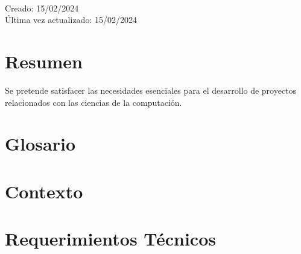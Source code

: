 \documentclass[a4paper, oneside, final]{scrartcl}
\begin{document}
\begin{center}
  {\fontsize{10}{10}\selectfont\scshape{}}\\
  {\fontsize{10}{10}\selectfont\scshape{}}\\
  \vspace{1cm}
  {\fontsize{9}{9}\selectfont\scshape{}}\\
  \vspace{0.2cm}
  {\fontsize{7}{7}\selectfont\scshape{}}\\
  {\fontsize{7}{7}\selectfont\scshape{}}\\
  {\fontsize{7}{7}\selectfont\scshape{}}\\
  {\fontsize{7}{7}\selectfont\scshape{}}\\
  {\fontsize{7}{7}\selectfont\scshape{}}\\
\end{center}
\vspace{2cm}

\begin{flushright}
  \footnotesize{Creado: 15/02/2024}\\
  \footnotesize{Última vez actualizado: 15/02/2024}\\
\end{flushright}

\section{Resumen}

Se pretende satisfacer las necesidades esenciales para el desarrollo de
proyectos relacionados con las ciencias de la computación.

\section{Glosario}

\section{Contexto}

\section{Requerimientos Técnicos}
\end{document}
